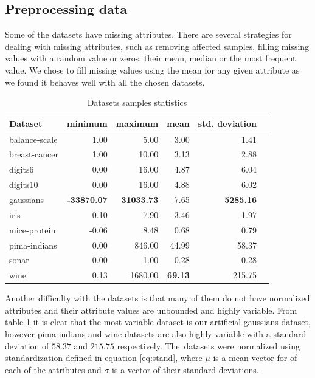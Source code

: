 \documentclass[12pt,a4paper]{report}
\begin{document}
\subsection{Preprocessing data} \label{chap:exp:preprocessing}
Some of the datasets have missing attributes. There are several strategies for dealing with missing attributes, such as removing affected samples, filling missing values with a random value or zeros, their mean, median or the most frequent value. We chose to fill missing values using the mean for any given attribute as we found it behaves well with all the chosen datasets.

\begin{table}[ht] \centering
\begin{tabular}{lrrrrr}
\hline
Dataset & minimum & maximum & mean & std. deviation \\
\hline
balance-scale           & 1.00  & 5.00    & 3.00  & 1.41 \\
breast-cancer           & 1.00  & 10.00   & 3.13  & 2.88 \\
digits6                 & 0.00  & 16.00   & 4.87  & 6.04 \\
digits10                & 0.00  & 16.00   & 4.88  & 6.02 \\
gaussians               & \textbf{-33870.07} & \textbf{31033.73} & -7.65 & \textbf{5285.16} \\
iris                    & 0.10  & 7.90    & 3.46  & 1.97 \\
mice-protein            & -0.06 & 8.48    & 0.68  & 0.79 \\
pima-indians            & 0.00  & 846.00  & 44.99 & 58.37 \\
sonar                   & 0.00  & 1.00    & 0.28  & 0.28 \\
wine                    & 0.13  & 1680.00 & \textbf{69.13} & 215.75 \\
\hline
\end{tabular}
\caption{Datasets samples statistics} \label{tab:datasets-samples}
\end{table}

Another difficulty with the datasets is that many of them do not have normalized attributes and their attribute values are unbounded and highly variable. From table \ref{tab:datasets-samples} it is clear that the most variable dataset is our artificial gaussians dataset, however pima-indians and wine datasets are also highly variable with a standard deviation of $58.37$ and $215.75$ respectively. The~datasets were normalized using standardization defined in equation \ref{eq:stand}, where $\mu$ is a mean vector for of each of the attributes and $\sigma$ is a vector of their standard deviations.
\end{document}

